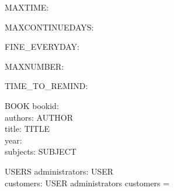 \begin{axdef}
  MAXTIME: \nat 
\end{axdef}

\begin{axdef}
  MAXCONTINUEDAYS: \nat 
\end{axdef}

\begin{axdef}
  FINE\_EVERYDAY: \nat 
\end{axdef}

\begin{axdef}
  MAXNUMBER: \nat 
\end{axdef}

\begin{axdef}
  TIME\_TO\_REMIND: \nat 
\end{axdef}

\begin{zed}
  [TIME]
\end{zed}

\begin{zed}
  [COPY]
\end{zed}

\begin{zed}
  [USER]
\end{zed}

\begin{zed}
  [AUTHOR]
\end{zed}

\begin{zed}
  [SUBJECT]
\end{zed}

\begin{zed}
  [TITLE]
\end{zed}

\begin{schema}{BOOK}
  bookid: \nat \\
  authors: \power  AUTHOR\\
  title: TITLE\\
  year: \nat \\
  subjects: \power  SUBJECT
\end{schema}

\begin{schema}{USERS}
  administrators: \power  USER\\
  customers: \power  USER
\where
  administrators \cap  customers = \emptyset
\end{schema}

